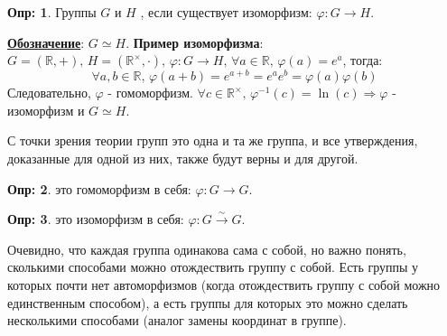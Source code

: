 \documentclass[12pt]{article}
\newcommand{\MR}{\mathbb{R}}
\theoremstyle{definition}
\newtheorem{defn}{Опр:}
\begin{document}
\begin{defn}
	Группы $G$ и $H$ , если существует изоморфизм: $\varphi \colon G \to H$.
\end{defn}
\textbf{\uline{Обозначение}}: $G \simeq H$.
\newpage
\textbf{Пример изоморфизма}: $G = (\MR, +), \, H = (\MR^\times,\cdot), \, \varphi \colon G \to H,\, \forall a\in \MR,\, \varphi(a) = e^a$, тогда:
$$
	\forall a,b \in \MR, \, \varphi(a + b) = e^{a + b} = e^ae^b = \varphi(a)\varphi(b)
$$
Следовательно, $\varphi$ - гомоморфизм. $\forall c \in \MR^\times, \, \varphi^{-1}(c) = \ln(c) \Rightarrow \varphi$ - изоморфизм и $G \simeq H$.

С точки зрения теории групп это одна и та же группа, и все утверждения, доказанные для одной из них, также будут верны и для другой. 

\begin{defn}
	 это гомоморфизм в себя: $\varphi \colon G \to G$.
\end{defn}
\begin{defn}
	 это изоморфизм в себя: $\varphi \colon G \xrightarrow{\sim} G$.
\end{defn}
Очевидно, что каждая группа одинакова сама с собой, но важно понять, сколькими способами можно отождествить группу с собой. Есть группы у которых почти нет автоморфизмов (когда отождествить группу с собой можно единственным способом), а есть группы для которых это можно сделать несколькими способами (аналог замены координат в группе).
\end{document}

